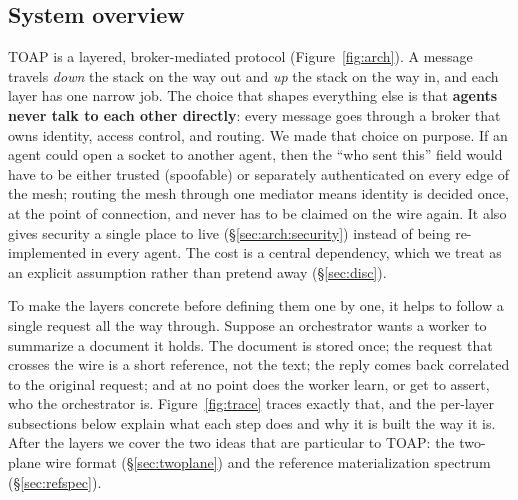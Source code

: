 \documentclass[11pt]{article}
\begin{document}
\subsection{System overview}
TOAP is a layered, broker-mediated protocol (Figure~\ref{fig:arch}). A message travels \emph{down} the
stack on the way out and \emph{up} the stack on the way in, and each layer has one narrow job. The
choice that shapes everything else is that \textbf{agents never talk to each other directly}: every
message goes through a broker that owns identity, access control, and routing. We made that choice on
purpose. If an agent could open a socket to another agent, then the ``who sent this'' field would have
to be either trusted (spoofable) or separately authenticated on every edge of the mesh; routing the
mesh through one mediator means identity is decided once, at the point of connection, and never has to
be claimed on the wire again. It also gives security a single place to live (\S\ref{sec:arch:security})
instead of being re-implemented in every agent. The cost is a central dependency, which we treat as an
explicit assumption rather than pretend away (\S\ref{sec:disc}).

To make the layers concrete before defining them one by one, it helps to follow a single request all
the way through. Suppose an orchestrator wants a worker to summarize a document it holds. The document
is stored once; the request that crosses the wire is a short reference, not the text; the reply comes
back correlated to the original request; and at no point does the worker learn, or get to assert, who
the orchestrator is. Figure~\ref{fig:trace} traces exactly that, and the per-layer subsections below
explain what each step does and why it is built the way it is. After the layers we cover the two ideas
that are particular to TOAP: the two-plane wire format (\S\ref{sec:twoplane}) and the reference
materialization spectrum (\S\ref{sec:refspec}).
\end{document}

